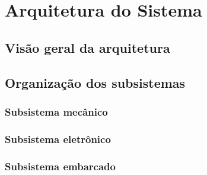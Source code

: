 
\chapter{Arquitetura do Sistema}
\label{chap:arquitetura}


\section{Visão geral da arquitetura}
\label{sec:visao_geral_arquitetura}


%

\section{Organização dos subsistemas}
\label{sec:subsistemas}


\subsection{Subsistema mecânico}
\label{subsec:subsistema_mecanico}


\subsection{Subsistema eletrônico}
\label{subsec:subsistema_eletronico}


\subsection{Subsistema embarcado}
\label{subsec:subsistema_embarcado}

